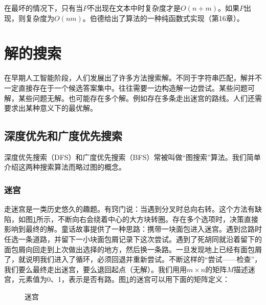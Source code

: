 \documentclass[b5paper]{ctexart}
\begin{document}
在最坏的情况下，只有当$P$不出现在文本中时复杂度才是$O(n+m)$\cite{boyer-moore}。如果$P$出现，则复杂度为$O(nm)$。伯德给出了算法的一种纯函数式实现（\cite{fp-pearls}第16章）。

\section{解的搜索}

在早期人工智能阶段，人们发展出了许多方法搜索解。不同于字符串匹配，解并不一定直接存在于一个候选答案集中。往往需要一边构造解一边尝试。某些问题可解，某些问题无解。也可能存在多个解。例如存在多条走出迷宫的路线。人们还需要求出某种意义下的最优解。

\subsection{深度优先和广度优先搜索}
 
深度优先搜索（DFS）和广度优先搜索（BFS）常被叫做“图搜索”算法。我们简单介绍这两种搜索算法而略过图的概念。

\subsubsection{迷宫}
走迷宫是一类历史悠久的趣题。有窍门说：当遇到分叉时总向右转。这个方法有缺陷，如图\ref{fig:maze-loop}所示，不断向右会绕着中心的大方块转圈。存在多个选项时，决策直接影响到最终的解。童话故事提供了一种思路：携带一块面包进入迷宫。遇到岔路时任选一条道路，并留下一小块面包屑记录下这次尝试。遇到了死胡同就沿着留下的面包屑向回走到上次做出选择的地方，然后换一条路。一旦发现地上已经有面包屑了，就说明我们进入了循环，必须回退并重新尝试。不断这样的“尝试——检查”，我们要么最终走出迷宫，要么退回起点（无解）。我们用用$m \times n$的矩阵$M$描述迷宫，元素值为0、1，表示是否有路。图\ref{fig:maze-loop}的迷宫可以用下面的矩阵定义：

\begin{figure}[htbp]
 \centering
 \caption{迷宫}
 \label{fig:maze-loop}
\end{figure}
\end{document}
